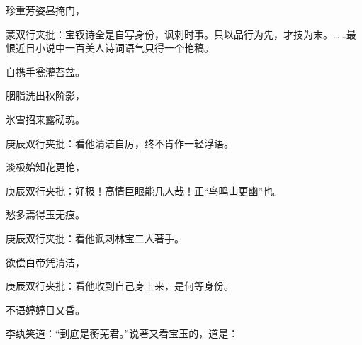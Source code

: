 \begin{poem}
    \begin{pl}珍重芳姿昼掩门，\end{pl}
    \begin{note}蒙双行夹批：宝钗诗全是自写身份，讽刺时事。只以品行为先，才技为末。……最恨近日小说中一百美人诗词语气只得一个艳稿。\end{note}

    \begin{pl}自携手瓮灌苔盆。\end{pl}

    \begin{pl}胭脂洗出秋阶影，\end{pl}

    \begin{pl}氷雪招来露砌魂。\end{pl}
    \begin{note}庚辰双行夹批：看他清洁自厉，终不肯作一轻浮语。\end{note}
    \begin{pl}淡极始知花更艳，\end{pl}
    \begin{note}庚辰双行夹批：好极！高情巨眼能几人哉！正“鸟鸣山更幽”也。\end{note}

    \begin{pl}愁多焉得玉无痕。\end{pl}
    \begin{note}庚辰双行夹批：看他讽刺林宝二人著手。\end{note}

    \begin{pl}欲偿白帝凭清洁，\end{pl}
    \begin{note}庚辰双行夹批：看他收到自己身上来，是何等身份。\end{note}

    \begin{pl}不语婷婷日又昏。    \end{pl}
\end{poem}
\begin{parag}
    李纨笑道：“到底是蘅芜君。”说著又看宝玉的，道是：
\end{parag}


